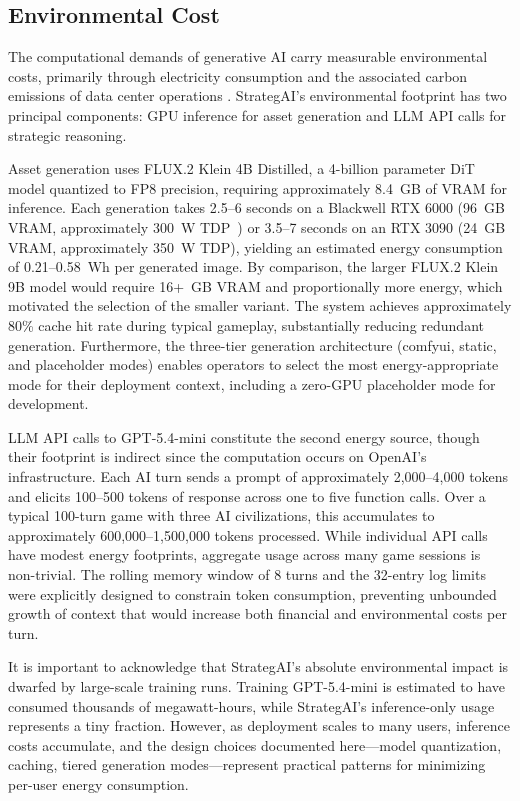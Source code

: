 \documentclass[conference]{IEEEtran}
\begin{document}
\subsection{Environmental Cost}

The computational demands of generative AI carry measurable environmental costs, primarily through electricity consumption and the associated carbon emissions of data center operations \cite{strubell2019energy}. StrategAI's environmental footprint has two principal components: GPU inference for asset generation and LLM API calls for strategic reasoning.

Asset generation uses FLUX.2 Klein 4B Distilled, a 4-billion parameter DiT model quantized to FP8 precision, requiring approximately 8.4~GB of VRAM for inference. Each generation takes 2.5--6 seconds on a Blackwell RTX 6000 (96~GB VRAM, approximately 300~W TDP~\cite{nvidia2024blackwell}) or 3.5--7 seconds on an RTX 3090 (24~GB VRAM, approximately 350~W TDP), yielding an estimated energy consumption of 0.21--0.58~Wh per generated image. By comparison, the larger FLUX.2 Klein 9B model would require 16+~GB VRAM and proportionally more energy, which motivated the selection of the smaller variant. The system achieves approximately 80\% cache hit rate during typical gameplay, substantially reducing redundant generation. Furthermore, the three-tier generation architecture (comfyui, static, and placeholder modes) enables operators to select the most energy-appropriate mode for their deployment context, including a zero-GPU placeholder mode for development.

LLM API calls to GPT-5.4-mini constitute the second energy source, though their footprint is indirect since the computation occurs on OpenAI's infrastructure. Each AI turn sends a prompt of approximately 2,000--4,000 tokens and elicits 100--500 tokens of response across one to five function calls. Over a typical 100-turn game with three AI civilizations, this accumulates to approximately 600,000--1,500,000 tokens processed. While individual API calls have modest energy footprints, aggregate usage across many game sessions is non-trivial. The rolling memory window of 8 turns and the 32-entry log limits were explicitly designed to constrain token consumption, preventing unbounded growth of context that would increase both financial and environmental costs per turn.

It is important to acknowledge that StrategAI's absolute environmental impact is dwarfed by large-scale training runs. Training GPT-5.4-mini is estimated to have consumed thousands of megawatt-hours, while StrategAI's inference-only usage represents a tiny fraction. However, as deployment scales to many users, inference costs accumulate, and the design choices documented here---model quantization, caching, tiered generation modes---represent practical patterns for minimizing per-user energy consumption.
\end{document}
